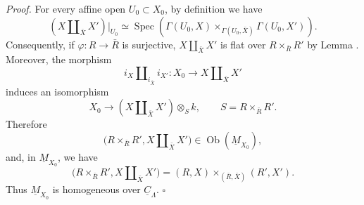\medskip
\noindent\textit{Proof.}
For every affine open $U_0\subset X_0$, by definition we have
\[
 (X\amalg_{\bar X}X')|_{U_0}
 \simeq
 \operatorname{Spec}\!\left(
   \Gamma(U_0,X)
   \times_{\Gamma(U_0,\bar X)}
   \Gamma(U_0,X')
 \right).
\]
Consequently, if $\varphi:R\longrightarrow\bar R$ is surjective,
$X\amalg_{\bar X}X'$ is flat over $R\times_{\bar R}R'$ by Lemma
. Moreover, the morphism
\[
 i_X\amalg_{i_{\bar X}}i_{X'}:
 X_0\longrightarrow X\amalg_{\bar X}X'
\]
induces an isomorphism
\[
 X_0\longrightarrow (X\amalg_{\bar X}X')\otimes_Sk,
 \qquad S=R\times_{\bar R}R'.
\]
Therefore
\[
 \bigl(R\times_{\bar R}R',X\amalg_{\bar X}X'\bigr)
 \in\operatorname{Ob}(\underline M_{X_0}),
\]
and, in $\underline M_{X_0}$, we have
\[
 \bigl(R\times_{\bar R}R',X\amalg_{\bar X}X'\bigr)
 =
 (R,X)\times_{(\bar R,\bar X)}(R',X').
\]
Thus $\underline M_{X_0}$ is homogeneous over
$\underline C_\Lambda$. \hfill$\square$

